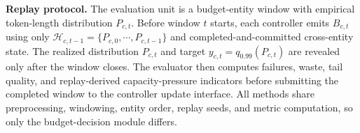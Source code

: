 \documentclass[sigplan,10pt, anonymous]{acmart}
\begin{document}

\textbf{Replay protocol.} The evaluation unit is a budget-entity window with empirical token-length distribution $P_{c,t}$. Before window $t$ starts, each controller emits $B_{c,t}$ using only $\mathcal{H}_{c,t-1}=\{P_{c,0},\cdots,P_{c,t-1}\}$ and completed-and-committed cross-entity state. The realized distribution $P_{c,t}$ and target $y_{c,t}=q_{0.99}(P_{c,t})$ are revealed only after the window closes. The evaluator then computes failures, waste, tail quality, and replay-derived capacity-pressure indicators before submitting the completed window to the controller update interface. All methods share preprocessing, windowing, entity order, replay seeds, and metric computation, so only the budget-decision module differs. 
\end{document}
